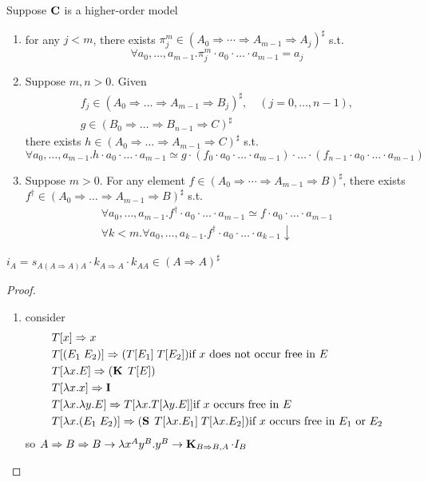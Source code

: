 \documentclass[11pt]{article}
\begin{document}
\begin{proposition}[]
\label{3.1.14}
Suppose \(\operatorname{\textbf{C}}\) is a higher-order model
\begin{enumerate}
\item for any \(j<m\), there exists \(\pi_j^m\in(A_0\Rightarrow\cdots\Rightarrow A_{m-1}\Rightarrow A_j)^\sharp\) s.t.
\begin{equation*}
\forall a_0,\dots,a_{m-1}.\pi_j^m\cdot a_0\cdot\dots\cdot a_{m-1}=a_j
\end{equation*}
\item Suppose \(m,n>0\). Given
\begin{gather*}
f_j\in(A_0\Rightarrow\dots\Rightarrow A_{m-1}\Rightarrow B_j)^\sharp,\quad(j=0,\dots,n-1),\\
g\in(B_0\Rightarrow\dots\Rightarrow B_{n-1}\Rightarrow C)^\sharp
\end{gather*}
there exists \(h\in (A_0\Rightarrow\dots\Rightarrow A_{m-1}\Rightarrow C)^\sharp\) s.t.
\begin{equation*}
\forall a_0,\dots,a_{m-1}.h\cdot a_0\cdot\dots\cdot a_{m-1}\simeq g\cdot(f_0\cdot a_0\cdot\dots\cdot a_{m-1})\cdot\dots\cdot(f_{n-1}\cdot a_0\cdot\dots\cdot a_{m-1})
\end{equation*}
\item Suppose \(m>0\). For any element \(f\in (A_0\Rightarrow\cdots\Rightarrow A_{m-1}\Rightarrow B)^\sharp\), there
exists \(f^\dagger\in(A_0\Rightarrow\dots\Rightarrow A_{m-1}\Rightarrow B)^\sharp\) s.t.
\begin{gather*}
\forall a_0,\dots,a_{m-1}.f^\dagger\cdot a_0\cdot\dots\cdot a_{m-1}\simeq f\cdot a_0\cdot\dots\cdot a_{m-1}\\
\forall k<m.\forall a_0,\dots,a_{k-1}.f^\dagger\cdot a_0\cdot\dots\cdot a_{k-1}\downarrow
\end{gather*}
\end{enumerate}
\end{proposition}

\(i_A=s_{A(A\Rightarrow A)A}\cdot k_{A\Rightarrow A}\cdot k_{AA}\in(A\Rightarrow A)^\sharp\)

\begin{proof}
\begin{enumerate}
\item consider
\begin{align*}
&T[x]\Rightarrow x\\
&T[(E_1\;E_2)]\Rightarrow(T[E_1]\;T[E_2])\text{if $x$ does not occur free in $E$}\\
&T[\lambda x.E]\Rightarrow(\operatorname{\textbf{K}}\;T[E])\\
&T[\lambda x.x]\Rightarrow\operatorname{\textbf{I}}\\
&T[\lambda x.\lambda y.E]\Rightarrow T[\lambda x.T[\lambda y.E]]\text{if $x$ occurs free in $E$}\\
&T[\lambda x.(E_1\;E_2)]\Rightarrow(\operatorname{\textbf{S}}\;T[\lambda x.E_1]\;T[\lambda x.E_2])\text{if $x$ occurs free in $E_1$ or $E_2$}
\end{align*}
so \(A\Rightarrow B\Rightarrow B\to\lambda x^Ay^B.y^B\to \operatorname{\textbf{K}}_{B\Rightarrow B,A}\cdot I_B\)
\end{enumerate}
\end{proof}
\end{document}
